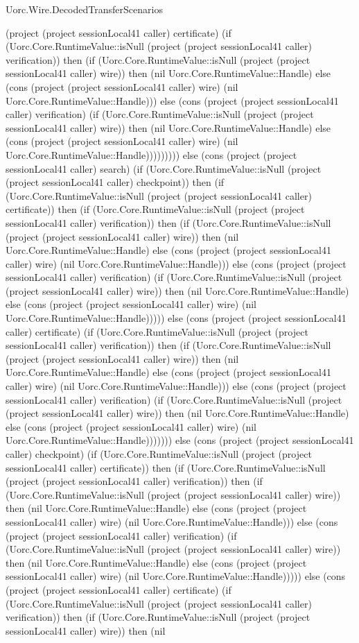 \begin{lexlean}{Uorc.Wire.DecodedTransferScenarios}
\begin{semanticmodule}
{(project (project sessionLocal41 caller) certificate) (if (Uorc.Core.RuntimeValue::isNull (project (project sessionLocal41 caller) verification)) then (if (Uorc.Core.RuntimeValue::isNull (project (project sessionLocal41 caller) wire)) then (nil Uorc.Core.RuntimeValue::Handle) else (cons (project (project sessionLocal41 caller) wire) (nil Uorc.Core.RuntimeValue::Handle))) else (cons (project (project sessionLocal41 caller) verification) (if (Uorc.Core.RuntimeValue::isNull (project (project sessionLocal41 caller) wire)) then (nil Uorc.Core.RuntimeValue::Handle) else (cons (project (project sessionLocal41 caller) wire) (nil Uorc.Core.RuntimeValue::Handle))))))))) else (cons (project (project sessionLocal41 caller) search) (if (Uorc.Core.RuntimeValue::isNull (project (project sessionLocal41 caller) checkpoint)) then (if (Uorc.Core.RuntimeValue::isNull (project (project sessionLocal41 caller) certificate)) then (if (Uorc.Core.RuntimeValue::isNull (project (project sessionLocal41 caller) verification)) then (if (Uorc.Core.RuntimeValue::isNull (project (project sessionLocal41 caller) wire)) then (nil Uorc.Core.RuntimeValue::Handle) else (cons (project (project sessionLocal41 caller) wire) (nil Uorc.Core.RuntimeValue::Handle))) else (cons (project (project sessionLocal41 caller) verification) (if (Uorc.Core.RuntimeValue::isNull (project (project sessionLocal41 caller) wire)) then (nil Uorc.Core.RuntimeValue::Handle) else (cons (project (project sessionLocal41 caller) wire) (nil Uorc.Core.RuntimeValue::Handle))))) else (cons (project (project sessionLocal41 caller) certificate) (if (Uorc.Core.RuntimeValue::isNull (project (project sessionLocal41 caller) verification)) then (if (Uorc.Core.RuntimeValue::isNull (project (project sessionLocal41 caller) wire)) then (nil Uorc.Core.RuntimeValue::Handle) else (cons (project (project sessionLocal41 caller) wire) (nil Uorc.Core.RuntimeValue::Handle))) else (cons (project (project sessionLocal41 caller) verification) (if (Uorc.Core.RuntimeValue::isNull (project (project sessionLocal41 caller) wire)) then (nil Uorc.Core.RuntimeValue::Handle) else (cons (project (project sessionLocal41 caller) wire) (nil Uorc.Core.RuntimeValue::Handle))))))) else (cons (project (project sessionLocal41 caller) checkpoint) (if (Uorc.Core.RuntimeValue::isNull (project (project sessionLocal41 caller) certificate)) then (if (Uorc.Core.RuntimeValue::isNull (project (project sessionLocal41 caller) verification)) then (if (Uorc.Core.RuntimeValue::isNull (project (project sessionLocal41 caller) wire)) then (nil Uorc.Core.RuntimeValue::Handle) else (cons (project (project sessionLocal41 caller) wire) (nil Uorc.Core.RuntimeValue::Handle))) else (cons (project (project sessionLocal41 caller) verification) (if (Uorc.Core.RuntimeValue::isNull (project (project sessionLocal41 caller) wire)) then (nil Uorc.Core.RuntimeValue::Handle) else (cons (project (project sessionLocal41 caller) wire) (nil Uorc.Core.RuntimeValue::Handle))))) else (cons (project (project sessionLocal41 caller) certificate) (if (Uorc.Core.RuntimeValue::isNull (project (project sessionLocal41 caller) verification)) then (if (Uorc.Core.RuntimeValue::isNull (project (project sessionLocal41 caller) wire)) then (nil }
\end{semanticmodule}
\end{lexlean}
